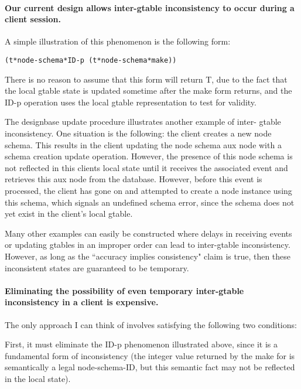 \paragraph {Our current design allows inter-gtable inconsistency to occur 
during a client session.}

A simple illustration of this phenomenon is the following form:

\begin{verbatim}
(t*node-schema*ID-p (t*node-schema*make))
\end{verbatim}

There is no reason to assume that this form will return T, due to the
fact that the local gtable state is updated sometime after the make
form returns, and the ID-p operation uses the local gtable
representation to test for validity.

The designbase update procedure illustrates another example of inter-
gtable inconsistency. One situation is the following: the client
creates a new node schema.  This results in the client updating the
node schema aux node with a schema creation update operation.
However, the presence of this node schema is not reflected in this
clients local state until it receives the associated event and
retrieves this aux node from the database.  However, before this event
is processed, the client has gone on and attempted to create a node
instance using this schema, which signals an undefined schema error,
since the schema does not yet exist in the client's local gtable.

Many other examples can easily be constructed where delays in
receiving events or updating gtables in an improper order can lead to
inter-gtable inconsistency.  However, as long as the ``accuracy implies
consistency" claim is true, then these inconsistent states are
guaranteed to be temporary.

\paragraph {Eliminating the possibility of even temporary inter-gtable
inconsistency in a client is expensive.}

The only approach I can think of involves satisfying the following
two conditions:

First, it must eliminate the ID-p phenomenon illustrated above,
since it is a fundamental form of inconsistency (the integer value
returned by the make for is semantically a legal node-schema-ID, but
this semantic fact may not be reflected in the local state).

